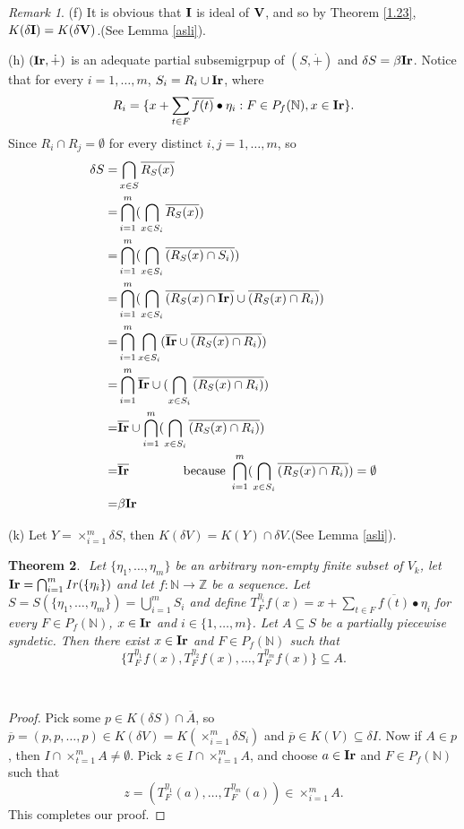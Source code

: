 \documentclass{amsart}
\newtheorem{theorem}{Theorem}[section]
\theoremstyle{definition}
\theoremstyle{remark}
\newtheorem{remark}[theorem]{Remark}
\numberwithin{equation}{section}
\newcommand{\Ir}{{\bf{Ir}}}
\newcommand{\V}{{\bf{V}}}
\newcommand{\I}{{\bf{I}}}
\begin{document}
\begin{remark}
(f) It is obvious that $\I$ is ideal of $\V$, and so by Theorem \ref{1.23}, $K(\delta \I)=K(\delta \V)$.(See Lemma \ref{asli}).

(h) $(\Ir,\dot{+})$ is an adequate partial subsemigrpup of $(S,\dot{+})$ and $\delta S=\beta \Ir$. Notice that for every $i=1,\ldots,m$, $S_i=R_i\cup\Ir$, where 
\[
R_i=\{x+\sum_{t\in F}\overline{f(t)}\bullet \eta_i:F\in P_f(\mathbb{N}), x\in \Ir\}.
\]
 Since $R_i\cap R_j=\emptyset$ for every distinct $i,j=1,\ldots,m$, so  
\begin{align*}
\delta S=&\bigcap_{x\in S}\overline{R_S(x)}\\
=&\bigcap_{i=1}^m(\bigcap_{x\in S_i}\overline{R_S(x)})\\
=&\bigcap_{i=1}^m(\bigcap_{x\in S_i}\overline{(R_S(x)\cap S_i)})\\
=&\bigcap_{i=1}^m(\bigcap_{x\in S_i}\overline{(R_S(x)\cap \Ir)}\cup\overline{(R_S(x)\cap R_i)})\\
=&\bigcap_{i=1}^m\bigcap_{x\in S_i}(\overline{\Ir}\cup\overline{(R_S(x)\cap R_i)})\\
=&\bigcap_{i=1}^m\overline{\Ir}\cup(\bigcap_{x\in S_i}\overline{(R_S(x)\cap R_i)})\\
=&\overline{\Ir}\cup\bigcap_{i=1}^m(\bigcap_{x\in S_i}\overline{(R_S(x)\cap R_i)})\\
=&\overline{\Ir}\qquad\qquad\mbox{ because }\bigcap_{i=1}^m(\bigcap_{x\in S_i}\overline{(R_S(x)\cap R_i)})=\emptyset\\
=&\beta \Ir\\
\end{align*}


(k) Let $Y=\times_{i=1}^m\delta S$, then  $K(\delta V)=K(Y)\cap \delta V$.(See Lemma \ref{asli}).



\end{remark}
\begin{theorem}{\label{5.9}}‎
	Let $\{\eta_1,\ldots,\eta_m\}$ be an arbitrary non-empty finite subset of $V_k$, let $\Ir=\bigcap_{i=1}^m Ir(\{\eta_i\})$ and let $f:\mathbb{N}\to \mathbb{Z}$ be a sequence. Let  $S=S(\{\eta_1,\ldots,\eta_m\})=\bigcup_{i=1}^mS_i$ and define $‎T_F^{\eta_i}f(x)= x+\sum_{t\in F} \overline{f(t)}\bullet\eta_i$ for every $F\in P_f(\mathbb{N})$, $x\in \Ir$ and $i\in\{1,\ldots,m\}$. Let $A\subseteq S$ be a partially piecewise syndetic. Then there exist \( x \in \Ir \) and \( F\in P_f(\mathbb{N})\) such that 
	\[
	‎\{T_F^{\eta_1}f(x),T_F^{\eta_2}f(x),\ldots,T_F^{\eta_m}f(x)\}\subseteq A‎.
	\]
\end{theorem}‎
\begin{proof}
	Pick some \( p \in K(\delta S)\cap \overline{A}\), so \(\overline{ p} = (p, p, \ldots, p) \in K(\delta V)=K(\times_{i=1}^m\delta S_i) \) and \( \overline{p} \in K(V) \subseteq \delta I \). Now if $A\in p$, then \( I \cap \times_{t=1}^{m} A \neq \emptyset \). Pick \( z \in I \cap \times_{t=1}^{m} A \), and choose \( a \in \Ir \) and \( F\in P_f(\mathbb{N}) \) such that  
	\[
	z = \left(T_F^{\eta_1}(a), \ldots, T_F^{\eta_m}(a)\right)\in\times_{i=1}^mA.
	\] 
	This completes our proof.
\end{proof}
\end{document}
